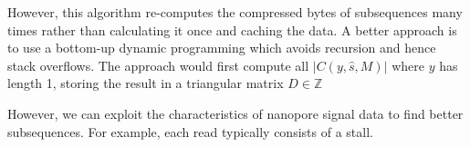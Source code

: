 However, this algorithm re-computes the compressed bytes of subsequences many times rather than calculating it once and caching the data.
A better approach is to use a bottom-up dynamic programming which avoids recursion and hence stack overflows.
The approach would first compute all $|C(y,\hat s,M)|$ where $y$ has length 1, storing the result in a triangular matrix $D\in \mathbb{Z}$

However, we can exploit the characteristics of nanopore signal data to find better subsequences.
For example, each read typically consists of a stall.

